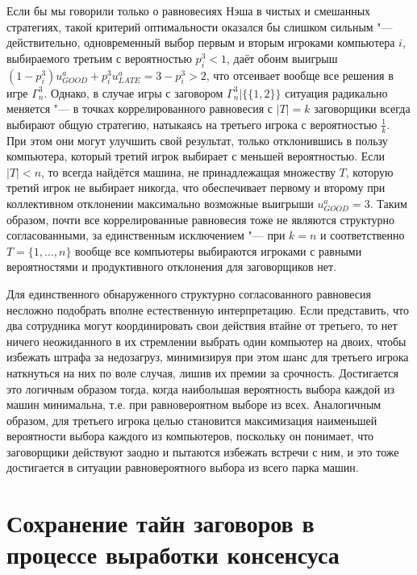 Если бы мы говорили только о равновесиях Нэша в чистых и смешанных стратегиях, такой критерий оптимальности оказался бы слишком сильным "--- действительно, одновременный выбор первым и вторым игроками компьютера $i$, выбираемого третьим с вероятностью $p_i^3 < 1$, даёт обоим выигрыш $(1 - p_i^3) u^a_{GOOD} + p_i^3 u^a_{LATE} = 3 - p_i^3 > 2$, что отсеивает вообще все решения в игре $\Gamma^3_n$. Однако, в случае игры с заговором $\Gamma^3_n | \{\{1,2\}\}$ ситуация радикально меняется "--- в точках коррелированного равновесия с $\left| T \right| = k$ заговорщики всегда выбирают общую стратегию, натыкаясь на третьего игрока с вероятностью $\frac{1}{k}$. При этом они могут улучшить свой результат, только отклонившись в пользу компьютера, который третий игрок выбирает с меньшей вероятностью. Если $\left| T \right| < n$, то всегда найдётся машина, не принадлежащая множеству $T$, которую третий игрок не выбирает никогда, что обеспечивает первому и второму при коллективном отклонении максимально возможные выигрыши $u^a_{GOOD} = 3$. Таким образом, почти все коррелированные равновесия тоже не являются структурно согласованными, за единственным исключением "--- при $k = n$ и соответственно $T = \{1, \ldots, n\}$ вообще все компьютеры выбираются игроками с равными вероятностями и продуктивного отклонения для заговорщиков нет.

Для единственного обнаруженного структурно согласованного равновесия несложно подобрать вполне естественную интерпретацию. Если представить, что два сотрудника могут координировать свои действия втайне от третьего, то нет ничего неожиданного в их стремлении выбрать один компьютер на двоих, чтобы избежать штрафа за недозагруз, минимизируя при этом шанс для третьего игрока наткнуться на них по воле случая, лишив их премии за срочность. Достигается это логичным образом тогда, когда наибольшая вероятность выбора каждой из машин минимальна, т.е. при равновероятном выборе из всех. Аналогичным образом, для третьего игрока целью становится максимизация наименьшей вероятности выбора каждого из компьютеров, поскольку он понимает, что заговорщики действуют заодно и пытаются избежать встречи с ним, и это тоже достигается в ситуации равновероятного выбора из всего парка машин.

\section{Сохранение тайн заговоров в процессе выработки консенсуса }\label{sec:ch2/sec6}

